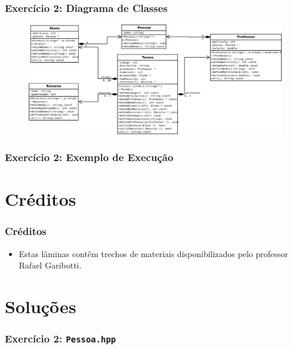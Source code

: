 \documentclass[aspectratio=169]{beamer}
\begin{document}
\begin{frame}\frametitle{Exercício 2: Diagrama de Classes}
\begin{figure}[h]
	\centering
	\includegraphics[height=0.7\paperheight]{imagens/modelagem_turma.png}
\end{figure}
\end{frame}

\begin{frame}[fragile]\frametitle{Exercício 2: Exemplo de Execução}

\end{frame}

\section{Créditos}

\begin{frame}\frametitle{Créditos}
\begin{itemize}
	\item Estas lâminas contêm trechos de materiais disponibilizados pelo professor Rafael Garibotti.
\end{itemize}
\end{frame}

\section{Soluções}

\begin{frame}[fragile]\frametitle{Exercício 2: \texttt{Pessoa.hpp}}

\end{frame}
\end{document}
